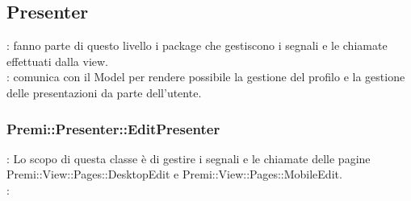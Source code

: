 \subsection{Presenter}{
	\textbf{\tipo}: fanno parte di questo livello i package che gestiscono i segnali e le chiamate effettuati dalla view.\\
	\textbf{\relaz}: comunica con il Model per rendere possibile la gestione del profilo e la gestione delle presentazioni da parte dell'utente.\\
	
	\subsubsection{Premi::Presenter::EditPresenter}{
		\textbf{\tipo}: Lo scopo di questa classe è di gestire i segnali e le chiamate delle pagine Premi::View::Pages::DesktopEdit e Premi::View::Pages::MobileEdit.\\	
		\textbf{\relaz}:
		\begin{itemize}
			

\end{itemize}}}
